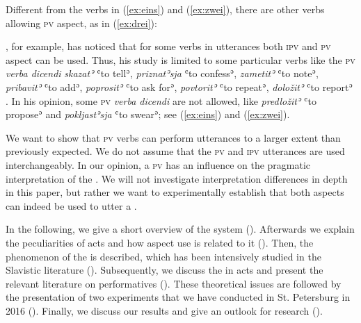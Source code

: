 \documentclass[output=paper,colorlinks,citecolor=brown,newtxmath,hidelinks]{langscibook}
\begin{document}
\noindent Different from the verbs in (\ref{ex:eins}) and (\ref{ex:zwei}), there are other  verbs allowing \textsc{pv} aspect, as in (\ref{ex:drei}):

\ea\label{ex:drei}
            \z
\z

\noindent\citet{Dickey2000}, for example, has noticed that for some  verbs in  utterances both \textsc{ipv} and \textsc{pv} aspect can be used. Thus, his study is limited to some particular verbs like the \textsc{pv} \textit{verba dicendi} \textit{skazatʾ} ʿto tellʾ, \textit{priznatʾsja} ʿto confessʾ, \textit{zametitʾ} ʿto noteʾ, \textit{pribavitʾ} ʿto addʾ, \textit{poprositʾ} ʿto ask forʾ, \textit{povtoritʾ} ʿto repeatʾ, \textit{doložitʾ} ʿto reportʾ \citep[179]{Dickey2000}. In his opinion, some \textsc{pv} \textit{verba dicendi} are not allowed, like \textit{predložitʾ} ʿto proposeʾ and \textit{pokljastʾsja} ʿto swearʾ; see (\ref{ex:eins}) and (\ref{ex:zwei}).

We want to show that \textsc{pv}  verbs can perform  utterances to a larger extent than previously expected. We do not assume that the \textsc{pv} and \textsc{ipv}  utterances are used interchangeably. In our opinion, a \textsc{pv}  has an influence on the pragmatic interpretation of the . We will not investigate interpretation differences in depth in this paper, but rather we want to experimentally establish that both aspects can indeed be used to utter a . 

In the following, we give a short overview of the   system (). Afterwards we explain the peculiarities of  acts and how aspect use is related to it (). Then, the phenomenon of the   is described, which has been intensively studied in the Slavistic literature (). Subsequently, we discuss the   in  acts and present the relevant literature on  performatives (). These theoretical issues are followed by the presentation of two experiments that we have conducted in St. Petersburg in 2016 (). Finally, we discuss our results and give an outlook for  research ().
\end{document}
